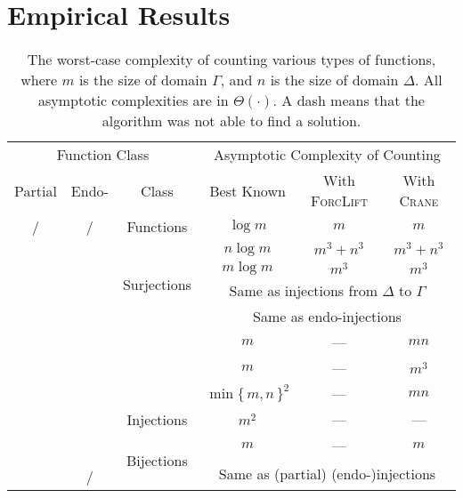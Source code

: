 \documentclass{article}
\theoremstyle{definition}
\newcommand{\cmark}{\ding{51}}%
\newcommand{\xmark}{\ding{55}}%
\begin{document}
\section{Empirical Results}\label{sec:results}

\begin{table*}[t]
  \centering
  \begin{tabular}{cccccc}
    \toprule
    \multicolumn{3}{c}{Function Class} & \multicolumn{3}{c}{Asymptotic Complexity of Counting} \\
    Partial & Endo- & Class & Best Known & With \textsc{ForcLift} & With \textsc{Crane} \\
    \midrule
    \rowcolor{gray!25}\cmark/\xmark & \cmark/\xmark & Functions & $\log m$ & $m$ & $m$ \\
    \xmark & \xmark & \multirow{4}{*}{Surjections} & $n \log m$ & $m^{3}+n^{3}$ & $m^{3}+n^{3}$ \\
    \xmark & \cmark & & $m \log m$ & $m^{3}$ & $m^{3}$ \\
    \cmark & \xmark & & \multicolumn{3}{c}{Same as injections from $\Delta$ to $\Gamma$} \\
    \cmark & \cmark & & \multicolumn{3}{c}{Same as endo-injections} \\
    \rowcolor{gray!25}\xmark & \xmark & & $m$ & --- & $mn$ \\
    \rowcolor{gray!25}\xmark & \cmark & & $m$ & --- & $m^3$ \\
    \rowcolor{gray!25}\cmark & \xmark & & ${\min\{\, m, n \,\}}^2$ & --- & $mn$ \\
    \rowcolor{gray!25}\cmark & \cmark & \multirow{-4}{*}{Injections} & $m^2$ & --- & --- \\
    \xmark & \xmark & \multirow{3}{*}{Bijections} & $m$ & --- & $m$ \\
    \xmark & \cmark & & \multicolumn{3}{c}{\multirow{2}{*}{Same as (partial) (endo-)injections}} \\
    \cmark & \cmark/\xmark & & \multicolumn{3}{c}{} \\
    \bottomrule
  \end{tabular}
  \caption{The worst-case complexity of counting various types of functions,
    where $m$ is the size of domain $\Gamma$, and $n$ is the size of domain
    $\Delta$. All asymptotic complexities are in $\Theta(\cdot)$. A dash means
    that the algorithm was not able to find a solution.}\label{tbl:results}
\end{table*}
\end{document}
